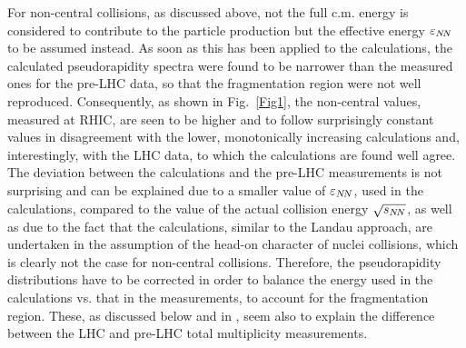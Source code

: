 \documentclass[twocolumn,showpacs,preprintnumbers,prd,superscriptaddress,nofootinbib]{revtex4}
\begin{document}
For non-central collisions, as discussed above, 
not the full c.m. energy  is considered to contribute to the 
particle production but   
the effective energy $\varepsilon_{N\!N}$ to be assumed instead. 
 As soon as this has been applied to the calculations, the calculated 
pseudorapidity spectra were found  to be narrower than the 
measured ones for the pre-LHC data, so that the fragmentation region were 
not well reproduced. Consequently, 
 as shown in Fig.~\ref{Fig1},
the non-central values, measured at RHIC, 
are seen to be higher and to follow surprisingly  constant values in 
disagreement with the lower, monotonically increasing   
calculations and, interestingly, with the LHC data, to which the 
calculations are found well agree.
 The  deviation between the calculations and the pre-LHC 
measurements is not surprising and can be explained due to a smaller value 
of $\varepsilon_{N\!N}$, used in the calculations, compared to the value of the actual 
collision energy $\sqrt{s_{N\!N}}$, as well as due to the fact that the calculations,
 similar to the Landau approach, are undertaken in the assumption of the
head-on character of nuclei collisions, which is clearly not the case for 
non-central collisions.
 Therefore, the pseudorapidity distributions have to be corrected in 
order to balance the energy used in the calculations vs. that in the 
measurements, to account for the fragmentation region.
 These, as discussed below and in , seem also to explain the 
difference between the LHC and pre-LHC total multiplicity measurements.
\end{document}
